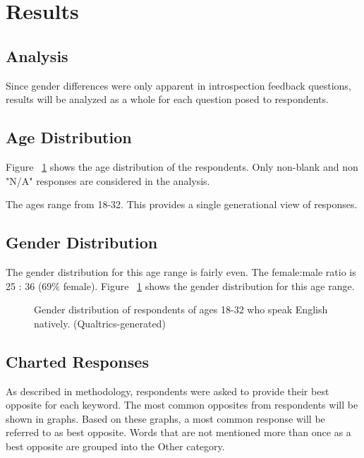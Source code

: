 \section {Results}
\subsection {Analysis} Since gender differences were only apparent in introspection feedback questions, results will be analyzed as a whole for each question posed to respondents.

\subsection {Age Distribution} Figure ~\ref{fig:gender_distribution} shows the age distribution of the respondents.  Only non-blank and non "N/A" responses are considered in the analysis.

The ages range from 18-32.  This provides a single generational view of responses. 

\subsection {Gender Distribution} The gender distribution for this age range is fairly even.  The female:male ratio is 25 : 36 (69\% female). Figure ~\ref{fig:gender_distribution} shows the gender distribution for this age range.

\begin{figure}[here]
	\centering
	\caption{Gender distribution of respondents of ages 18-32 who speak English natively. (Qualtrics-generated)}
	\label{fig:gender_distribution}
\end{figure}

\subsection {Charted Responses} As described in methodology, respondents were asked to provide their best opposite for each keyword.  The most common opposites from respondents will be shown in graphs.  Based on these graphs, a most common response will be referred to as best opposite.  Words that are not mentioned more than once as a best opposite are grouped into the Other category.  
 

